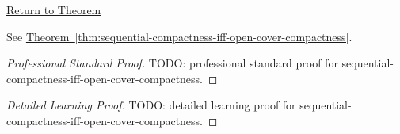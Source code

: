 \newpage
{}
\label{prf:sequential-compactness-iff-open-cover-compactness}

\begin{remark*}[Return]
\hyperref[thm:sequential-compactness-iff-open-cover-compactness]{Return to Theorem}
\end{remark*}

\begin{theorem*}
See \hyperref[thm:sequential-compactness-iff-open-cover-compactness]{Theorem~\ref*{thm:sequential-compactness-iff-open-cover-compactness}}.
\end{theorem*}

\begin{proof}[Professional Standard Proof]
\LRAProofBodyStart
TODO: professional standard proof for sequential-compactness-iff-open-cover-compactness.
\end{proof}

\begin{proof}[Detailed Learning Proof]
\LRAProofBodyStart
TODO: detailed learning proof for sequential-compactness-iff-open-cover-compactness.
\end{proof}

\begin{remark*}
\end{remark*}

\begin{dependencies}
\NoLocalDependencies
\end{dependencies}

\clearpage
